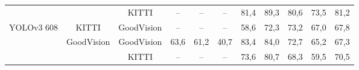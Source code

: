 \documentclass[twoside]{ctuthesis}
\theoremstyle{plain}
\theoremstyle{definition}
\theoremstyle{note}
\begin{document}
\begin{table}[hbt]
{\begin{tabular}{|c|c|c|c|c|c|c|c|c|c|c|}
                                                         &                                                                     & KITTI                                                              & --                                                                     & --                                                                 & --                                                                        & 81,4                                                               & 89,3                                                                  & 80,6                                                                 & 73,5                                                               & 81,2                                                            \\ \cline{3-11} 
\multirow{-3}{*}{YOLOv3 608}                             & \multirow{-2}{*}{KITTI}                                             & GoodVision                                                         & --                                                                     & --                                                                 & --                                                                        & 58,6                                                               & 72,3                                                                  & 73,2                                                                 & 67,0                                                               & 67,8                                                            \\ \hline
                                                         & GoodVision                                                          & GoodVision                                                         & 63,6                                                                   & 61,2                                                               & 40,7                                                                      & 83,4                                                               & 84,0                                                                  & 72,7                                                                 & 65,2                                                               & 67,3                                                            \\ \cline{2-11} 
                                                         &                                                                     & KITTI                                                              & --                                                                     & --                                                                 & --                                                                        & 73,6                                                               & 80,7                                                                  & 68,3                                                                 & 59,5                                                               & 70,5                                                            \\ \cline{3-11} 

\end{tabular}}
\end{table}
\end{document}
